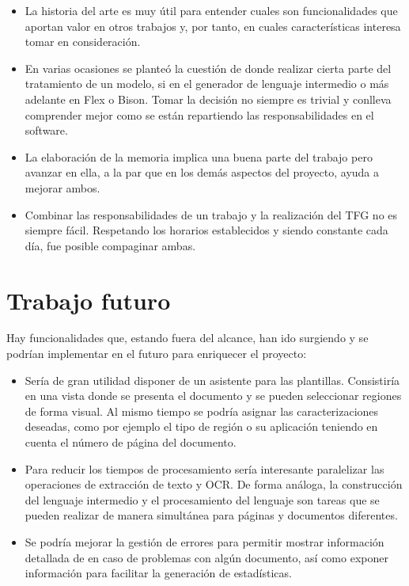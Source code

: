 \begin{itemize}
	\item La historia del arte es muy útil para entender cuales son funcionalidades que aportan valor en otros trabajos y, por tanto, en cuales características interesa tomar en consideración.
	\item En varias ocasiones se planteó la cuestión de donde realizar cierta parte del tratamiento de un modelo, si en el generador de lenguaje intermedio o más adelante en Flex o Bison. Tomar la decisión no siempre es trivial y conlleva comprender mejor como se están repartiendo las responsabilidades en el software.
	\item La elaboración de la memoria implica una buena parte del trabajo pero avanzar en ella, a la par que en los demás aspectos del proyecto, ayuda a mejorar ambos.
	\item Combinar las responsabilidades de un trabajo y la realización del TFG no es siempre fácil. Respetando los horarios establecidos y siendo constante cada día, fue posible compaginar ambas.
\end{itemize}

\section{Trabajo futuro}

Hay funcionalidades que, estando fuera del alcance, han ido surgiendo y se podrían implementar en el futuro para enriquecer el proyecto:

\begin{itemize}
	\item Sería de gran utilidad disponer de un asistente para las plantillas. Consistiría en una vista donde se presenta el documento y se pueden seleccionar regiones de forma visual. Al mismo tiempo se podría asignar las caracterizaciones deseadas, como por ejemplo el tipo de región o su aplicación teniendo en cuenta el número de página del documento.
	\item Para reducir los tiempos de procesamiento sería interesante paralelizar las operaciones de extracción de texto y OCR. De forma análoga, la construcción del lenguaje intermedio y el procesamiento del lenguaje son tareas que se pueden realizar de manera simultánea para páginas y documentos diferentes.
	\item Se podría mejorar la gestión de errores para permitir mostrar información detallada de en caso de problemas con algún documento, así como exponer información para facilitar la generación de estadísticas.
\end{itemize}
